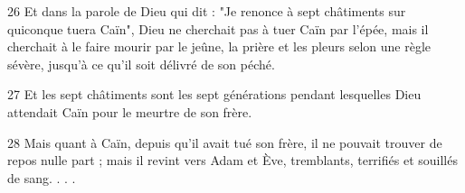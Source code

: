 \par 26 Et dans la parole de Dieu qui dit : "Je renonce à sept châtiments sur quiconque tuera Caïn", Dieu ne cherchait pas à tuer Caïn par l'épée, mais il cherchait à le faire mourir par le jeûne, la prière et les pleurs selon une règle sévère, jusqu'à ce qu'il soit délivré de son péché.

\par 27 Et les sept châtiments sont les sept générations pendant lesquelles Dieu attendait Caïn pour le meurtre de son frère.

\par 28 Mais quant à Caïn, depuis qu'il avait tué son frère, il ne pouvait trouver de repos nulle part ; mais il revint vers Adam et Ève, tremblants, terrifiés et souillés de sang. . . .


